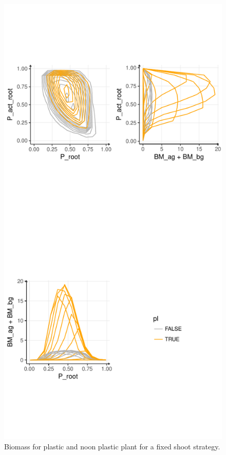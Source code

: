 \documentclass[review]{elsarticle}
\begin{document}
\begin{figure}
\includegraphics[width = \textwidth]{./Figures/abs_BM_pl_nonpl_10034.pdf}
\caption{Biomass for plastic and noon plastic plant for a fixed shoot strategy.}
\end{figure}
\end{document}
